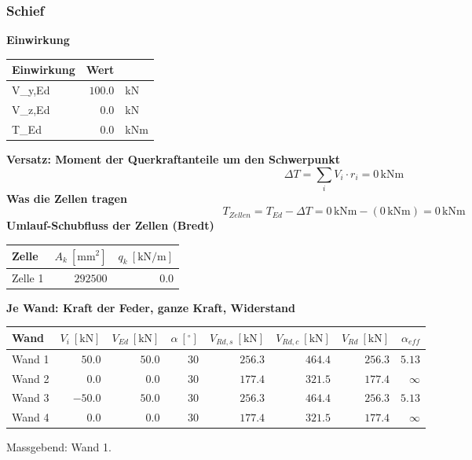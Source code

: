 \documentclass[11pt,a4paper]{article}
\begin{document}
\subsubsection{Schief}
\noindent\textbf{Einwirkung}
\begin{longtable}{lrl}
\hline
Einwirkung & Wert &  \\
\hline
\endhead
V\_y,Ed & $100.0$ & kN \\
V\_z,Ed & $0.0$ & kN \\
T\_Ed & $0.0$ & kNm \\
\hline
\end{longtable}
\noindent\textbf{Versatz: Moment der Querkraftanteile um den Schwerpunkt}
\begin{equation*}
\Delta T = \sum_i V_i \cdot r_i = 0\,\mathrm{kNm}
\end{equation*}
\noindent\textbf{Was die Zellen tragen}
\begin{equation*}
T_{Zellen} = T_{Ed} - \Delta T = 0\,\mathrm{kNm} - \left(0\,\mathrm{kNm}\right) = 0\,\mathrm{kNm}
\end{equation*}
\noindent\textbf{Umlauf-Schubfluss der Zellen (Bredt)}
\begin{longtable}{lrr}
\hline
Zelle & $A_k\ [\mathrm{mm}^2]$ & $q_k\ [\mathrm{kN/m}]$ \\
\hline
\endhead
Zelle 1 & $292500$ & $0.0$ \\
\hline
\end{longtable}
\noindent\textbf{Je Wand: Kraft der Feder, ganze Kraft, Widerstand}
\begin{longtable}{lrrrrrrr}
\hline
Wand & $V_i\ [\mathrm{kN}]$ & $V_{Ed}\ [\mathrm{kN}]$ & $\alpha\ [{}^{\circ}]$ & $V_{Rd,s}\ [\mathrm{kN}]$ & $V_{Rd,c}\ [\mathrm{kN}]$ & $V_{Rd}\ [\mathrm{kN}]$ & $\alpha_{eff}$ \\
\hline
\endhead
Wand 1 & $50.0$ & $50.0$ & $30$ & $256.3$ & $464.4$ & $256.3$ & $5.13$ \\
Wand 2 & $0.0$ & $0.0$ & $30$ & $177.4$ & $321.5$ & $177.4$ & $\infty$ \\
Wand 3 & $-50.0$ & $50.0$ & $30$ & $256.3$ & $464.4$ & $256.3$ & $5.13$ \\
Wand 4 & $0.0$ & $0.0$ & $30$ & $177.4$ & $321.5$ & $177.4$ & $\infty$ \\
\hline
\end{longtable}
Massgebend: Wand 1.
\end{document}
